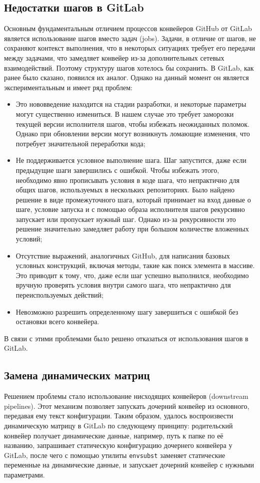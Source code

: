 \subsection{Недостатки шагов в GitLab} \label{subsec:gitlab-steps-problems}
Основным фундаментальным отличием процессов конвейеров GitHub от GitLab является использование шагов вместо задач (jobs).
Задачи, в отличие от шагов, не сохраняют контекст выполнения, что в некоторых ситуациях требует его передачи между задачами,
что замедляет конвейер из-за дополнительных сетевых взаимодействий.
Поэтому структуру шагов хотелось бы сохранить.
В GitLab, как ранее было сказано, появился их аналог.
Однако на данный момент он является экспериментальным и имеет ряд проблем:
\begin{itemize}
  \item Это нововведение находится на стадии разработки, и некоторые параметры могут существенно измениться.
        В нашем случае это требует заморозки текущей версии исполнителя шагов, чтобы избежать неожиданных поломок.
        Однако при обновлении версии могут возникнуть ломающие изменения, что потребует значительной переработки кода;
  \item Не поддерживается условное выполнение шага.
        Шаг запустится, даже если предыдущие шаги завершились с ошибкой.
        Чтобы избежать этого, необходимо явно прописывать условия в коде шага, что непрактично для общих шагов, используемых в нескольких репозиториях.
        Было найдено решение в виде промежуточного шага, который принимает на вход данные о шаге, условие запуска и с помощью образа исполнителя шагов рекурсивно запускает или пропускает нужный шаг.
        Однако из-за рекурсивности это решение значительно замедляет работу при большом количестве вложенных условий;
  \item Отсутствие выражений, аналогичных GitHub, для написания базовых условных конструкций, включая методы, такие как поиск элемента в массиве.
        Это приводит к тому, что, даже если шаг успешно выполнился, необходимо вручную проверять условия внутри самого шага, что непрактично для переиспользуемых действий;
  \item Невозможно разрешить определенному шагу завершиться с ошибкой без остановки всего конвейера.
\end{itemize}

В связи с этими проблемами было решено отказаться от использования шагов в GitLab.

\subsection{Замена динамических матриц} \label{subsec:dymamic-matricies}
Решением проблемы стало использование нисходящих конвейеров (downstream pipelines).
Этот механизм позволяет запускать дочерний конвейер из основного, передавая ему текст конфигурации.
Таким образом, удалось воспроизвести динамическую матрицу в GitLab по следующему принципу:
родительский конвейер получает динамические данные, например, путь к папке по её названию,
запрашивает статическую конфигурацию дочернего конвейера у GitLab,
после чего с помощью утилиты \texttt{envsubst} заменяет статические переменные на динамические данные,
и запускает дочерний конвейер с нужными параметрами.

